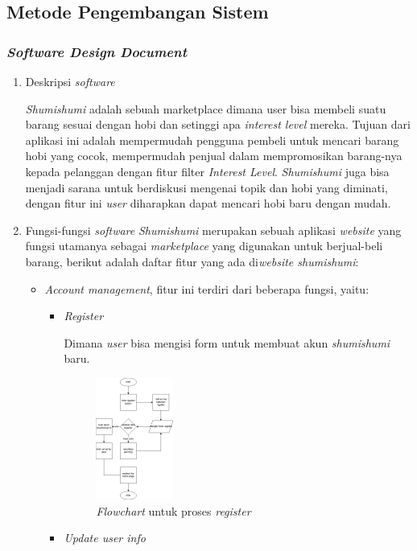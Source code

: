 \documentclass[a4paper]{article}
\newcommand{\subbab}[1]{%
    \subsection{#1}%
    \setcounter{figure}{0}
    \setcounter{table}{0}
}
\newcommand{\subsubbab}[1]{%
    \subsubsection{#1}%
}
\begin{document}
\subbab{Metode Pengembangan Sistem}
\subsubbab{\textit{Software Design Document}}
\begin{enumerate}[label=\alph*. ]
    \item Deskripsi \textit{software}

        \textit{Shumishumi} adalah sebuah marketplace dimana user bisa membeli suatu barang sesuai dengan hobi dan setinggi apa \textit{interest level} mereka. Tujuan dari aplikasi ini adalah mempermudah pengguna pembeli untuk mencari barang hobi yang cocok, mempermudah penjual dalam mempromosikan barang-nya kepada pelanggan dengan fitur filter \textit{Interest Level}. \textit{Shumishumi} juga bisa menjadi sarana untuk berdiskusi mengenai topik dan hobi yang diminati, dengan fitur ini \textit{user} diharapkan dapat mencari hobi baru dengan mudah.

    \item Fungsi-fungsi \textit{software}
        \textit{Shumishumi} merupakan sebuah aplikasi \textit{website} yang fungsi utamanya sebagai \textit{marketplace} yang digunakan untuk berjual-beli barang, berikut adalah daftar fitur yang ada di\textit{website shumishumi}:
        \begin{itemize}
            \item \textit{Account management}, fitur ini terdiri dari beberapa fungsi, yaitu:
            \begin{itemize}
                \item \textit{Register}

                Dimana \textit{user} bisa mengisi form untuk membuat akun \textit{shumishumi} baru.
                \begin{figure}[h]
                    \centering
                    \includegraphics*[height=4cm]{./diagram/flowchart/chart/register.png}
                    \caption{\textit{Flowchart} untuk proses \textit{register}}
                \end{figure}
                \newpage

                \item \textit{Update user info}


\end{itemize}
\end{itemize}
\end{enumerate}
\end{document}
